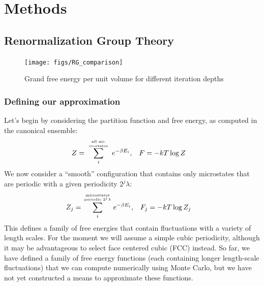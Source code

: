 \documentclass[letterpaper,twocolumn,amsmath,amssymb,pre,aps,10pt]{revtex4-1}
\begin{document}
\section{Methods}

\subsection{Renormalization Group Theory}

\begin{figure}
  \centering
  \texttt{[image: figs/RG\_comparison]}
  \caption{Grand free energy per unit volume for different iteration depths}
\end{figure}

\subsubsection{Defining our approximation}
Let's begin by considering the partition function and free energy, as
computed in the canonical ensemble:
\begin{align}
  Z &= \sum_i^{\text{\tiny\begin{minipage}{5em}
      \begin{center}
        \tiny all microstates\end{center}\end{minipage}}}
       e^{-\beta E_i}, & F &= -kT\log Z
\end{align}
We now consider a ``smooth'' configuration that contains only
microstates that are periodic with a given periodicity $2^j\lambda$:
\newcommand\sumstatesperiodic[1]{\sum_i^{\text{\tiny\begin{minipage}{6em}
      \begin{center}
        \tiny microstates periodic $#1$\end{center}\end{minipage}}}}
\begin{align}
  Z_j &= \sumstatesperiodic{2^j\lambda}
       e^{-\beta E_i}, & F_j &= -kT\log Z_j
       \label{eq:Zn}
\end{align}
This defines a family of free energies that contain fluctuations with
a variety of length scales.  For the moment we will assume a simple
cubic periodicity, although it may be advantageous to select face
centered cubic (FCC) instead.  So far, we have defined a family of
free energy functions (each containing longer length-scale
fluctuations) that we can compute numerically using Monte Carlo, but
we have not yet constructed a means to approximate these functions.
\end{document}
